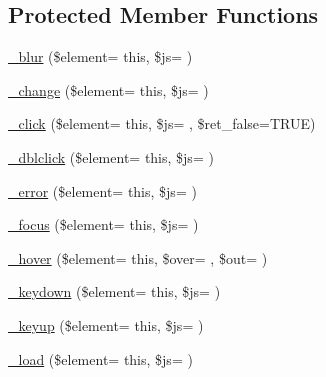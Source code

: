 \subsection*{Protected Member Functions}
\begin{DoxyCompactItemize}
\item 
\hyperlink{class_c_i___jquery_af28fbf01a4418e2bb3e93a9a716248d8}{\+\_\+blur} (\$element= \textquotesingle{}this\textquotesingle{}, \$js= \textquotesingle{}\textquotesingle{})
\item 
\hyperlink{class_c_i___jquery_abb95dffbc65cae5c082bd420f4481d60}{\+\_\+change} (\$element= \textquotesingle{}this\textquotesingle{}, \$js= \textquotesingle{}\textquotesingle{})
\item 
\hyperlink{class_c_i___jquery_a80855ab8fcdffa6a4b6003d240749391}{\+\_\+click} (\$element= \textquotesingle{}this\textquotesingle{}, \$js= \textquotesingle{}\textquotesingle{}, \$ret\+\_\+false=T\+R\+U\+E)
\item 
\hyperlink{class_c_i___jquery_adc098d89d426ba40e9c06652214c8a86}{\+\_\+dblclick} (\$element= \textquotesingle{}this\textquotesingle{}, \$js= \textquotesingle{}\textquotesingle{})
\item 
\hyperlink{class_c_i___jquery_a6e3e47849dde9e62e2cf52d74304ee91}{\+\_\+error} (\$element= \textquotesingle{}this\textquotesingle{}, \$js= \textquotesingle{}\textquotesingle{})
\item 
\hyperlink{class_c_i___jquery_add25f6f9e5c5668bb8263db99aa93659}{\+\_\+focus} (\$element= \textquotesingle{}this\textquotesingle{}, \$js= \textquotesingle{}\textquotesingle{})
\item 
\hyperlink{class_c_i___jquery_abbb87225c3fe0db00364f4c29628a387}{\+\_\+hover} (\$element= \textquotesingle{}this\textquotesingle{}, \$over= \textquotesingle{}\textquotesingle{}, \$out= \textquotesingle{}\textquotesingle{})
\item 
\hyperlink{class_c_i___jquery_a3b5601144b1894bdd735c42a4c2d3df5}{\+\_\+keydown} (\$element= \textquotesingle{}this\textquotesingle{}, \$js= \textquotesingle{}\textquotesingle{})
\item 
\hyperlink{class_c_i___jquery_a9a000183ccaca2b995e67085f81b14fd}{\+\_\+keyup} (\$element= \textquotesingle{}this\textquotesingle{}, \$js= \textquotesingle{}\textquotesingle{})
\item 
\hyperlink{class_c_i___jquery_ac93429cce1bc09272410f27545f93a7a}{\+\_\+load} (\$element= \textquotesingle{}this\textquotesingle{}, \$js= \textquotesingle{}\textquotesingle{})
\item 

\end{DoxyCompactItemize}
